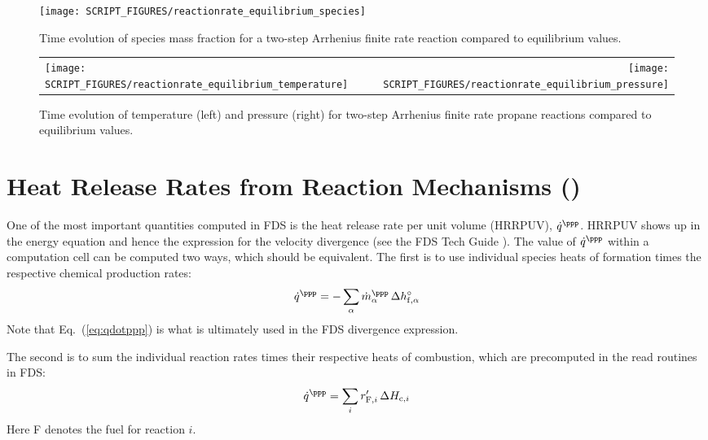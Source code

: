 \documentclass[11pt]{book}
\begin{document}
\begin{figure}[h!]
\centering
\texttt{[image: SCRIPT\_FIGURES/reactionrate\_equilibrium\_species]}
\caption[Species evolution in an equilibrium case]{Time evolution of species mass fraction for a two-step Arrhenius finite rate reaction compared to equilibrium values.}
\label{fig:Arrhenius_2Order_1stepb}
\end{figure}

\begin{figure}[ht]
\begin{tabular*}{\textwidth}{lr}
\texttt{[image: SCRIPT\_FIGURES/reactionrate\_equilibrium\_temperature]} &
\texttt{[image: SCRIPT\_FIGURES/reactionrate\_equilibrium\_pressure]}
\end{tabular*}
\caption[Temperature and pressure evolution for equilibrium case]{Time evolution of temperature (left) and pressure (right) for two-step Arrhenius finite rate propane reactions compared to equilibrium values.}
\label{fig:Arrhenius_175Order_23stepb}
\end{figure}

\clearpage

\section{Heat Release Rates from Reaction Mechanisms ()}
\label{hrrpuv_reac}
\label{hrrpuv_reac_arrhenius}
\label{hrrpuv_reac_extinction}
\label{hrrpuv_reac_parallel}
\label{hrrpuv_reac_parallel_2}
\label{hrrpuv_reac_series}
\label{hrrpuv_reac_simple}
\label{hrrpuv_reac_single}
\label{hrrpuv_reac_soot}

One of the most important quantities computed in FDS is the heat release rate per unit volume (HRRPUV), $\dot{q}^{\ppp}$.  HRRPUV shows up in the energy equation and hence the expression for the velocity divergence (see the FDS Tech Guide \cite{FDS_Math_Guide}).  The value of $\dot{q}^{\ppp}$ within a computation cell can be computed two ways, which should be equivalent.  The first is to use individual species heats of formation times the respective chemical production rates:
\begin{equation}
\label{eq:qdotppp}
\dot{q}^{\ppp} = - \sum_\alpha \dot{m}_\alpha^{\ppp} \, \Delta h_{{\rm f},\alpha}^\circ
\end{equation}
Note that Eq.~(\ref{eq:qdotppp}) is what is ultimately used in the FDS divergence expression.

The second is to sum the individual reaction rates  times their respective heats of combustion, which are precomputed in the read routines in FDS:
\begin{equation}
\label{eq:qdotppp2}
\dot{q}^{\ppp} = \sum_i r_{{\rm F},i}^\prime \, \Delta H_{{\rm c},i}
\end{equation}
Here F denotes the fuel for reaction $i$.
\end{document}
